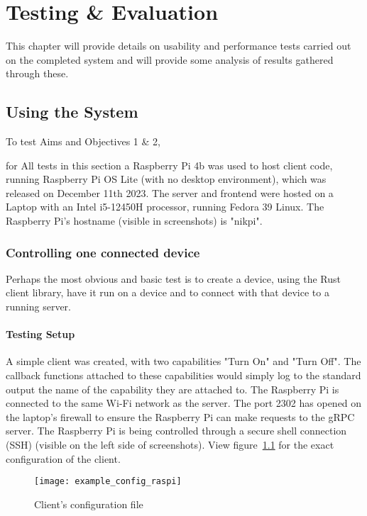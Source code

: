 \chapter{Testing \& Evaluation} \label{cha:testing}
This chapter will provide details on usability and performance tests carried out on the completed system and will provide some analysis of results gathered through these.
\section{Using the System}
To test Aims and Objectives 1 \& 2, 

for All tests in this section a Raspberry Pi 4b was used to host client code, running Raspberry Pi OS Lite (with no desktop environment), which was released on December 11th 2023. The server and frontend were hosted on a Laptop with an Intel i5-12450H processor, running Fedora 39 Linux. The Raspberry Pi's hostname (visible in screenshots) is "nikpi".
\subsection{Controlling one connected device} \label{cha:testing:onedevice}
Perhaps the most obvious and basic test is to create a device, using the Rust client library, have it run on a device and to connect with that device to a running server. 

\subsubsection{Testing Setup}
A simple client was created, with two capabilities "Turn On" and "Turn Off". The callback functions attached to these capabilities would simply log to the standard output the name of the capability they are attached to. The Raspberry Pi is connected to the same Wi-Fi network as the server. The port 2302 has opened on the laptop's firewall to ensure the Raspberry Pi can make requests to the gRPC server. The Raspberry Pi is being controlled through a secure shell connection (SSH) (visible on the left side of screenshots). View figure~\ref{fig:example_config_raspi} for the exact configuration of the client.
\begin{figure}[h]
\caption{Client's configuration file}
\texttt{[image: example\_config\_raspi]}
\label{fig:example_config_raspi}
\end{figure}

